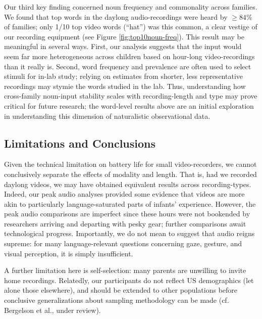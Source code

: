\documentclass[man]{apa6}
\theoremstyle{definition}
\theoremstyle{definition}
\theoremstyle{definition}
\theoremstyle{remark}
\begin{document}
Our third key finding concerned noun frequency and commonality across
families. We found that top words in the daylong audio-recordings were
heard by \(\geq84\%\) of families; only 1/10 top video words
(\enquote{hat}) was this common, a clear vestige of our recording
equipment (see Figure \ref{fig:top10noun-freq}). This result may be
meaningful in several ways. First, our analysis suggests that the input
would seem far more heterogeneous across children based on hour-long
video-recordings than it really is. Second, word frequency and
prevalence are often used to select stimuli for in-lab study; relying on
estimates from shorter, less representative recordings may stymie the
words studied in the lab. Thus, understanding how cross-family
noun-input stability scales with recording-length and type may prove
critical for future research; the word-level results above are an
initial exploration in understanding this dimension of naturalistic
observational data.

\subsection{Limitations and
Conclusions}\label{limitations-and-conclusions}

Given the technical limitation on battery life for small
video-recorders, we cannot conclusively separate the effects of modality
and length. That is, had we recorded daylong videos, we may have
obtained equivalent results across recording-types. Indeed, our peak
audio analyses provided some evidence that videos are more akin to
particularly language-saturated parts of infants' experience. However,
the peak audio comparisons are imperfect since these hours were not
bookended by researchers arriving and departing with pesky gear; further
comparisons await technological progress. Importantly, we do not mean to
suggest that audio reigns supreme: for many language-relevant questions
concerning gaze, gesture, and visual perception, it is simply
insufficient.

A further limitation here is self-selection: many parents are unwilling
to invite home recordings. Relatedly, our participants do not reflect US
demographics (let alone those elsewhere), and should be extended to
other populations before conclusive generalizations about sampling
methodology can be made (cf. Bergelson et al., under review).
\end{document}
